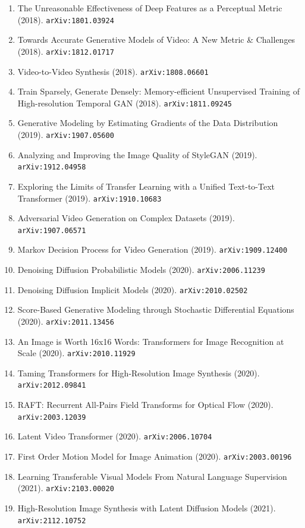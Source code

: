 \documentclass[11pt]{article}
\begin{document}
\begin{enumerate}
  \item The Unreasonable Effectiveness of Deep Features as a Perceptual Metric (2018). \texttt{arXiv:1801.03924}
  \item Towards Accurate Generative Models of Video: A New Metric \& Challenges (2018). \texttt{arXiv:1812.01717}
  \item Video-to-Video Synthesis (2018). \texttt{arXiv:1808.06601}
  \item Train Sparsely, Generate Densely: Memory-efficient Unsupervised Training
  of High-resolution Temporal GAN (2018). \texttt{arXiv:1811.09245}
  \item Generative Modeling by Estimating Gradients of the Data Distribution (2019). \texttt{arXiv:1907.05600}
  \item Analyzing and Improving the Image Quality of StyleGAN (2019). \texttt{arXiv:1912.04958}
  \item Exploring the Limits of Transfer Learning with a Unified Text-to-Text
  Transformer (2019). \texttt{arXiv:1910.10683}
  \item Adversarial Video Generation on Complex Datasets (2019). \texttt{arXiv:1907.06571}
  \item Markov Decision Process for Video Generation (2019). \texttt{arXiv:1909.12400}
  \item Denoising Diffusion Probabilistic Models (2020). \texttt{arXiv:2006.11239}
  \item Denoising Diffusion Implicit Models (2020). \texttt{arXiv:2010.02502}
  \item Score-Based Generative Modeling through Stochastic Differential
  Equations (2020). \texttt{arXiv:2011.13456}
  \item An Image is Worth 16x16 Words: Transformers for Image Recognition at
  Scale (2020). \texttt{arXiv:2010.11929}
  \item Taming Transformers for High-Resolution Image Synthesis (2020). \texttt{arXiv:2012.09841}
  \item RAFT: Recurrent All-Pairs Field Transforms for Optical Flow (2020). \texttt{arXiv:2003.12039}
  \item Latent Video Transformer (2020). \texttt{arXiv:2006.10704}
  \item First Order Motion Model for Image Animation (2020). \texttt{arXiv:2003.00196}
  \item Learning Transferable Visual Models From Natural Language Supervision (2021). \texttt{arXiv:2103.00020}
  \item High-Resolution Image Synthesis with Latent Diffusion Models (2021). \texttt{arXiv:2112.10752}

\end{enumerate}
\end{document}
